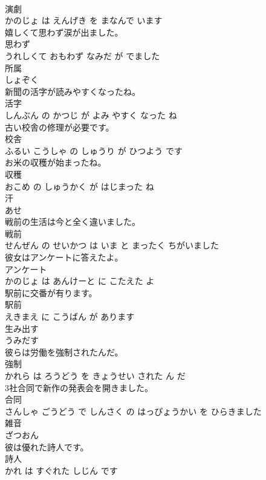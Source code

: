 \documentclass[8pt]{extreport}
\begin{document}
\begin{CJK}{UTF8}{min}
\\	演劇 
\\	かのじょ は えんげき を まなんで います			
\\	嬉しくて思わず涙が出ました。	
\\	思わず 
\\	うれしくて おもわず なみだ が でました			
\\	所属	
\\	しょぞく		
\\	新聞の活字が読みやすくなったね。	
\\	活字 
\\	しんぶん の かつじ が よみ やすく なった ね			
\\	古い校舎の修理が必要です。	
\\	校舎 
\\	ふるい こうしゃ の しゅうり が ひつよう です			
\\	お米の収穫が始まったね。	
\\	収穫 
\\	おこめ の しゅうかく が はじまった ね			
\\	汗	
\\	あせ		
\\	戦前の生活は今と全く違いました。	
\\	戦前 
\\	せんぜん の せいかつ は いま と まったく ちがいました			
\\	彼女はアンケートに答えたよ。	
\\	アンケート 
\\	かのじょ は あんけーと に こたえた よ			
\\	駅前に交番が有ります。	
\\	駅前 
\\	えきまえ に こうばん が あります			
\\	生み出す	
\\	うみだす		
\\	彼らは労働を強制されたんだ。	
\\	強制 
\\	かれら は ろうどう を きょうせい された ん だ			
\\	3社合同で新作の発表会を開きました。	
\\	合同 
\\	さんしゃ ごうどう で しんさく の はっぴょうかい を ひらきました			
\\	雑音	
\\	ざつおん		
\\	彼は優れた詩人です。	
\\	詩人 
\\	かれ は すぐれた しじん です			

\end{CJK}
\end{document}

